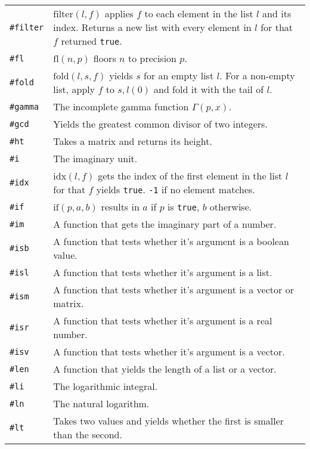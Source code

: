 \documentclass[10pt]{article}
\begin{document}
\begin{longtable}{p{}p{}}
        \verb|#filter| & $ \mathrm{filter}(l,f) $ applies $ f $ to each element in the list $ l $ and its index.
                         Returns a new list with every element in $ l $ for that $ f $ returned \verb|true|. \\
        \verb|#fl|     & $ \mathrm{fl}(n,p) $ floors $ n $ to precision $ p $. \\
        \verb|#fold|   & $ \mathrm{fold}(l,s,f) $ yields $ s $ for an empty list $ l $.
                         For a non-empty list, apply $ f $ to $ s, l(0) $ and fold it with the tail of $ l $. \\
        \verb|#gamma|  & The incomplete gamma function $ \Gamma(p, x) $. \\
        \verb|#gcd|    & Yields the greatest common divisor of two integers. \\
        \verb|#ht|     & Takes a matrix and returns its height. \\
        \verb|#i|      & The imaginary unit. \\
        \verb|#idx|    & $ \mathrm{idx}(l,f) $ gets the index of the first element in the list $ l $ for that $ f $ yields \verb|true|.
                         \verb|-1| if no element matches. \\
        \verb|#if|     & $ \mathrm{if}(p,a,b) $ results in $ a $ if $ p $ is \verb|true|, $ b $ otherwise. \\
        \verb|#im|     & A function that gets the imaginary part of a number. \\
        \verb|#isb|    & A function that tests whether it's argument is a boolean value. \\
        \verb|#isl|    & A function that tests whether it's argument is a list. \\
        \verb|#ism|    & A function that tests whether it's argument is a vector or matrix. \\
        \verb|#isr|    & A function that tests whether it's argument is a real number. \\
        \verb|#isv|    & A function that tests whether it's argument is a vector. \\
        \verb|#len|    & A function that yields the length of a list or a vector. \\
        \verb|#li|     & The logarithmic integral. \\
        \verb|#ln|     & The natural logarithm. \\
        \verb|#lt|     & Takes two values and yields whether the first is smaller than the second.

\end{longtable}
\end{document}
